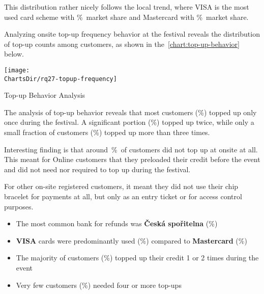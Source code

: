 This distribution rather nicely follows the local trend, where VISA is the most used card scheme with \%~market share and Mastercard with \%~market share\cite{spbk_czech_profil_karty}.


Analyzing onsite top-up frequency behavior at the festival reveals the distribution of top-up counts among customers, as shown in the~\autoref{chart:top-up-behavior} below.

\begin{chart}[H]
	\centering
	\texttt{[image: \\ChartsDir/rq27-topup-frequency]}
	\caption{ Top-up Behavior Analysis}
	\label{chart:top-up-behavior}
	\source
\end{chart}

The analysis of top-up behavior reveals that most customers (\%) topped up only once during the festival.
A significant portion (\%) topped up twice, while only a small fraction of customers (\%) topped up more than three times.

Interesting finding is that around~\%~of customers did not top up at onsite at all.
This meant for Online customers that they preloaded their credit before the event and did not need nor required to top up during the festival.

For other on-site registered customers, it meant they did not use their chip bracelet for payments at all, but only as an entry ticket or for access control purposes.

\begin{keytakeaways}
	\begin{itemize}
		\item The most common bank for refunds was \textbf{Česká spořitelna} (\%)
		\item \textbf{VISA} cards were predominantly used (\%) compared to \textbf{Mastercard} (\%)
		\item The majority of customers (\%) topped up their credit 1 or 2 times during the event
		\item Very few customers (\%) needed four or more top-ups
	\end{itemize}
\end{keytakeaways}



